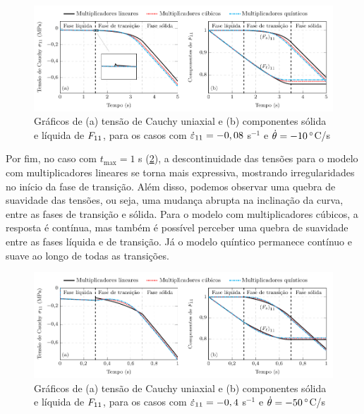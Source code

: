 \documentclass[Tese.tex]{subfiles}
\begin{document}
\begin{figure}[htb]
	\centering
	\caption{Gráficos de (a) tensão de Cauchy uniaxial e (b) componentes sólida e líquida de $F_{11}$, para os casos com $\dot{{\varepsilon}}_{11} = -0,08$ s$^{-1}$ e $\dot{\theta} = -10\, ^{\circ}$C/s}
	\label{fig:PhaseChangeMonotonicStrainLiquidToSolid-t5}
	\includegraphics[scale=1.0]{Figuras/PhaseChangeMonotonic/PhaseChangeMonotonicStrainLiquidToSolid-t5.pdf}
\end{figure}

Por fim, no caso com $t_\text{max}=1$ s (\cref{fig:PhaseChangeMonotonicStrainLiquidToSolid-t1}), a descontinuidade das tensões para o modelo com multiplicadores lineares se torna mais expressiva, mostrando irregularidades no início da fase de transição. Além disso, podemos observar uma quebra de suavidade das tensões, ou seja, uma mudança abrupta na inclinação da curva, entre as fases de transição e sólida. Para o modelo com multiplicadores cúbicos, a resposta é contínua, mas também é possível perceber uma quebra de suavidade entre as fases líquida e de transição. Já o modelo quíntico permanece contínuo e suave ao longo de todas as transições.

\begin{figure}[htb]
	\centering
	\caption{Gráficos de (a) tensão de Cauchy uniaxial e (b) componentes sólida e líquida de $F_{11}$, para os casos com $\dot{{\varepsilon}}_{11} = -0,4$ s$^{-1}$ e $\dot{\theta} = -50\, ^{\circ}$C/s}
	\label{fig:PhaseChangeMonotonicStrainLiquidToSolid-t1}
	\includegraphics[scale=1.0]{Figuras/PhaseChangeMonotonic/PhaseChangeMonotonicStrainLiquidToSolid-t1.pdf}
\end{figure}
\end{document}
